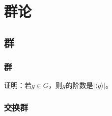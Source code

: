 \documentclass[../main.tex]{subfiles}
\begin{document}
\setcounter{chapter}{2}
\chapter{群论}
\section{群}
\subsection{群}
\begin{exercise}\label{exe:order_and_cyclic_subgroup}
证明：若$g\in G$，则$g$的阶数是$|\langle g\rangle|$。
\end{exercise}
\subsection{交换群}
\end{document}

